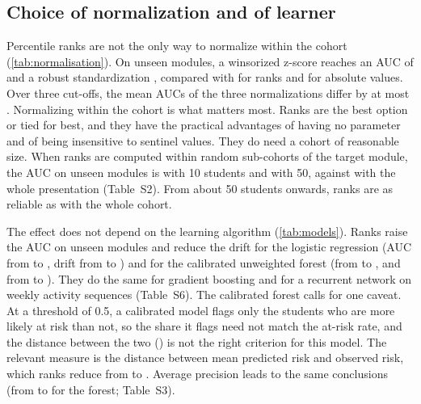 \documentclass[journal]{IEEEtran}
\begin{document}
\subsection{Choice of normalization and of learner}
\label{sec:normalisation}
Percentile ranks are not the only way to normalize within the cohort (\cref{tab:normalisation}). On unseen modules, a winsorized z-score reaches an AUC of \resNormZscoreAucB{} and a robust standardization \resNormRobustAucB{}, compared with \resNormRankAucB{} for ranks and \resAucAbsBTwentyFive{} for absolute values. Over three cut-offs, the mean AUCs of the three normalizations differ by at most \resNormMaxSpread{}. Normalizing within the cohort is what matters most. Ranks are the best option or tied for best, and they have the practical advantages of having no parameter and of being insensitive to sentinel values. They do need a cohort of reasonable size. When ranks are computed within random sub-cohorts of the target module, the AUC on unseen modules is \resCohortAucTen{} \resCohortAucTenCI{} with 10 students and \resCohortAucFifty{} \resCohortAucFiftyCI{} with 50, against \resCohortAucFull{} with the whole presentation (Table~S2). From about 50 students onwards, ranks are as reliable as with the whole cohort.

The effect does not depend on the learning algorithm (\cref{tab:models}). Ranks raise the AUC on unseen modules and reduce the drift for the logistic regression (AUC from \resModLogitAucBAbs{} to \resModLogitAucBRank, drift from \resModLogitDriftAbs{} to \resModLogitDriftRank) and for the calibrated unweighted forest (from \resModCalAucBAbs{} to \resModCalAucBRank, and from \resModCalDriftAbs{} to \resModCalDriftRank). They do the same for gradient boosting and for a recurrent network on weekly activity sequences (Table~S6). The calibrated forest calls for one caveat. At a threshold of 0.5, a calibrated model flags only the students who are more likely at risk than not, so the share it flags need not match the at-risk rate, and the distance between the two (\resModCalGapRank) is not the right criterion for this model. The relevant measure is the distance between mean predicted risk and observed risk, which ranks reduce from \resModCalPGapAbs{} to \resModCalPGapRank. Average precision leads to the same conclusions (from \resApBAbs{} to \resApBRel{} for the forest; Table~S3).



\end{document}
